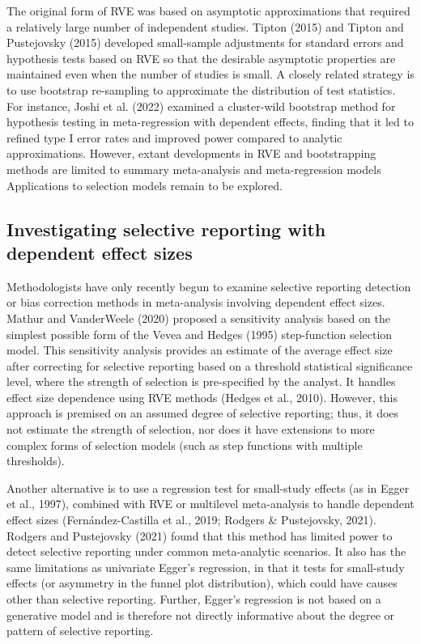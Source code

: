 \documentclass[
  man, donotrepeattitle,floatsintext]{apa7}
\begin{document}
The original form of RVE was based on asymptotic approximations that required a relatively large number of independent studies.
Tipton (2015) and Tipton and Pustejovsky (2015) developed small-sample adjustments for standard errors and hypothesis tests based on RVE so that the desirable asymptotic properties are maintained even when the number of studies is small.
A closely related strategy is to use bootstrap re-sampling to approximate the distribution of test statistics.
For instance, Joshi et al. (2022) examined a cluster-wild bootstrap method for hypothesis testing in meta-regression with dependent effects, finding that it led to refined type I error rates and improved power compared to analytic approximations.
However, extant developments in RVE and bootstrapping methods are limited to summary meta-analysis and meta-regression models
Applications to selection models remain to be explored.

\subsection{Investigating selective reporting with dependent effect sizes}\label{investigating-selective-reporting-with-dependent-effect-sizes}

Methodologists have only recently begun to examine selective reporting detection or bias correction methods in meta-analysis involving dependent effect sizes.
Mathur and VanderWeele (2020) proposed a sensitivity analysis based on the simplest possible form of the Vevea and Hedges (1995) step-function selection model.
This sensitivity analysis provides an estimate of the average effect size after correcting for selective reporting based on a threshold statistical significance level, where the strength of selection is pre-specified by the analyst. It handles effect size dependence using RVE methods (Hedges et al., 2010).
However, this approach is premised on an assumed degree of selective reporting; thus, it does not estimate the strength of selection, nor does it have extensions to more complex forms of selection models (such as step functions with multiple thresholds).

Another alternative is to use a regression test for small-study effects (as in Egger et al., 1997), combined with RVE or multilevel meta-analysis to handle dependent effect sizes (Fernández-Castilla et al., 2019; Rodgers \& Pustejovsky, 2021).
Rodgers and Pustejovsky (2021) found that this method has limited power to detect selective reporting under common meta-analytic scenarios.
It also has the same limitations as univariate Egger's regression, in that it tests for small-study effects (or asymmetry in the funnel plot distribution), which could have causes other than selective reporting.
Further, Egger's regression is not based on a generative model and is therefore not directly informative about the degree or pattern of selective reporting.
\end{document}
